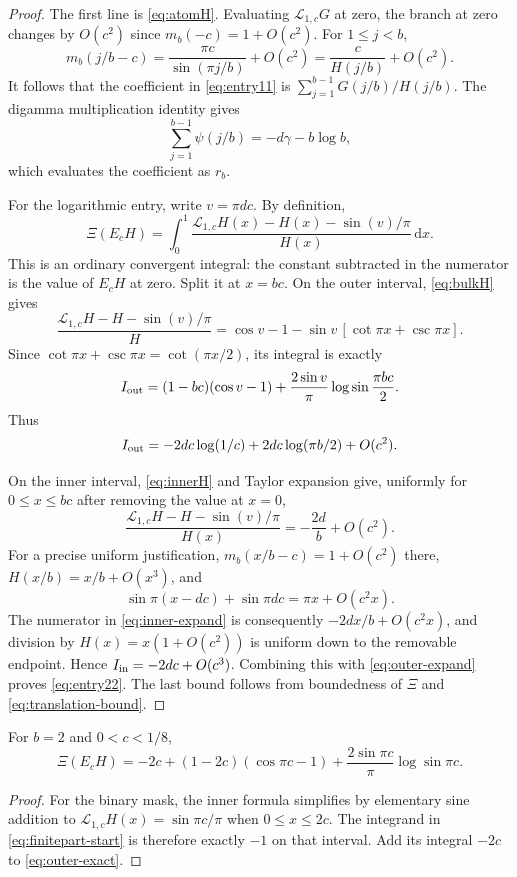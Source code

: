 \documentclass[11pt,a4paper]{article}
\numberwithin{equation}{section}
\theoremstyle{definition}
\theoremstyle{remark}
\newcommand{\dd}{\,\mathrm d}
\newcommand{\Lop}{\mathcal L}
\begin{document}
\begin{proof}
The first line is \cref{eq:atomH}. Evaluating $\Lop_{1,c}G$ at zero,
the branch at zero changes by $O(c^2)$ since $m_b(-c)=1+O(c^2)$.
For $1\le j<b$,
\[
 m_b(j/b-c)=\frac{\pi c}{\sin(\pi j/b)}+O(c^2)
            =\frac{c}{H(j/b)}+O(c^2).
\]
It follows that the coefficient in \cref{eq:entry11} is
$\sum_{j=1}^{b-1}G(j/b)/H(j/b)$. The digamma multiplication identity gives
\[
 \sum_{j=1}^{b-1}\psi(j/b)=-d\gamma-b\log b,
\]
which evaluates the coefficient as $r_b$.

For the logarithmic entry, write $v=\pi dc$. By definition,
\begin{equation}
 \Xi(E_cH)=\int_0^1
 \frac{\Lop_{1,c}H(x)-H(x)-\sin(v)/\pi}{H(x)}\dd x.
 \label{eq:finitepart-start}
\end{equation}
This is an ordinary convergent integral: the constant subtracted in the
numerator is the value of $E_cH$ at zero. Split it at $x=bc$.
On the outer interval, \cref{eq:bulkH} gives
\[
 \frac{\Lop_{1,c}H-H-\sin(v)/\pi}{H}
 =\cos v-1-\sin v\,[\cot\pi x+\csc\pi x].
\]
Since $\cot\pi x+\csc\pi x=\cot(\pi x/2)$, its integral is exactly
\begin{equation}
 I_{\rm out}=(1-bc)(\cos v-1)
       +\frac{2\sin v}{\pi}\log\sin\frac{\pi bc}{2}.
 \label{eq:outer-exact}
\end{equation}
Thus
\begin{equation}
 I_{\rm out}=-2dc\log(1/c)+2dc\log(\pi b/2)+O(c^2).
 \label{eq:outer-expand}
\end{equation}

On the inner interval, \cref{eq:innerH} and Taylor expansion give,
uniformly for $0\le x\le bc$ after removing the value at $x=0$,
\begin{equation}
 \frac{\Lop_{1,c}H-H-\sin(v)/\pi}{H(x)}
     =-\frac{2d}{b}+O(c^2).
 \label{eq:inner-expand}
\end{equation}
For a precise uniform justification, $m_b(x/b-c)=1+O(c^2)$ there,
$H(x/b)=x/b+O(x^3)$, and
\[
 \sin\pi(x-dc)+\sin\pi dc=\pi x+O(c^2x).
\]
The numerator in \cref{eq:inner-expand} is consequently
$-2dx/b+O(c^2x)$, and division by $H(x)=x(1+O(c^2))$ is uniform down
to the removable endpoint. Hence
$I_{\rm in}=-2dc+O(c^3)$. Combining this with
\cref{eq:outer-expand} proves \cref{eq:entry22}.
The last bound follows from boundedness of $\Xi$ and
\cref{eq:translation-bound}.
\end{proof}

\begin{corollary}
\label{cor:binary-exact}
For $b=2$ and $0<c<1/8$,
\begin{equation}
 \Xi(E_cH)=-2c+(1-2c)(\cos\pi c-1)
          +\frac{2\sin\pi c}{\pi}\log\sin\pi c.
 \label{eq:binary-exact}
\end{equation}
\end{corollary}
\begin{proof}
For the binary mask, the inner formula simplifies by elementary
sine addition to $\Lop_{1,c}H(x)=\sin\pi c/\pi$ when $0\le x\le2c$.
The integrand in \cref{eq:finitepart-start} is therefore exactly $-1$
on that interval. Add its integral $-2c$ to \cref{eq:outer-exact}.
\end{proof}
\end{document}
